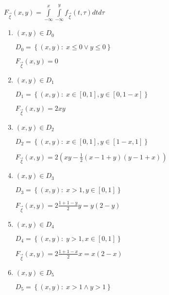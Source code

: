 \begin{example}
\begin{enumerate}
        $F_{\vec{\xi}}(x, y) = 
        \int\limits_{-\infty}^{x} \int\limits_{-\infty}^{y} 
        f_{\vec{\xi}}(t, \tau) dt d\tau$

        \begin{enumerate}[label=(\Roman*)]
            \item $(x, y) \in D_0$
            
            $D_0 = \left\{(x, y):\; x \leq 0 \lor y \leq 0\right\}$

            $F_{\vec{\xi}}(x, y) = 0$

            \item $(x, y) \in D_1$
            
            $D_1 = \left\{(x, y):\; x \in \left[0, 1\right],
            y \in \left[0, 1-x\right]\right\}$

            $F_{\vec{\xi}}(x, y) = 2xy$

            \item $(x, y) \in D_2$
            
            $D_2 = \left\{(x, y):\; x \in \left[0, 1\right],
            y \in \left[1-x, 1\right]\right\}$

            $F_{\vec{\xi}}(x, y) = 2(xy - \frac{1}{2}(x-1+y)(y-1+x))$

            \item $(x, y) \in D_3$
            
            $D_3 = \left\{(x, y):\; x > 1,
            y \in \left[0, 1\right]\right\}$

            $F_{\vec{\xi}}(x, y) = 2\frac{1+1-y}{2}y = y(2-y)$

            \item $(x, y) \in D_4$
            
            $D_4 = \left\{(x, y):\; y > 1,
            x \in \left[0, 1\right]\right\}$

            $F_{\vec{\xi}}(x, y) = 2\frac{1+1-x}{2}x = x(2-x)$

            \item $(x, y) \in D_5$
            
            $D_5 = \left\{(x, y):\; x > 1 \land y > 1\right\}$


\end{enumerate}
\end{enumerate}
\end{example}

